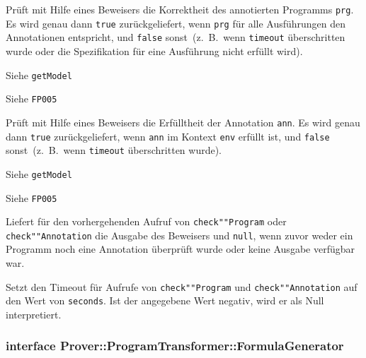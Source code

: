 
\begin{description}%


    Prüft mit Hilfe eines Beweisers die Korrektheit des annotierten
    Programms \texttt{prg}. Es wird genau dann \texttt{true}
    zurückgeliefert, wenn \texttt{prg} für alle Ausführungen den
    Annotationen entspricht, und \texttt{false} sonst~(z.~B.\, wenn
    \texttt{timeout} überschritten wurde oder die Spezifikation für
    eine Ausführung nicht erfüllt wird).%

    Siehe \texttt{getModel}%

    Siehe \texttt{FP005}%


    Prüft mit Hilfe eines Beweisers die Erfülltheit der Annotation
    \texttt{ann}. Es wird genau dann \texttt{true} zurückgeliefert,
    wenn \texttt{ann} im Kontext \texttt{env} erfüllt ist, und
    \texttt{false} sonst~(z.~B.\, wenn \texttt{timeout} überschritten
    wurde).%

    Siehe \texttt{getModel}%

    Siehe \texttt{FP005}%


    Liefert für den vorhergehenden Aufruf von \texttt{check""Program}
    oder \texttt{check""Annotation} die Ausgabe des Beweisers und
    \texttt{null}, wenn zuvor weder ein Programm noch eine Annotation
    überprüft wurde oder keine Ausgabe verfügbar war.%


    Setzt den Timeout für Aufrufe von \texttt{check""Program} und
    \texttt{check""Annotation} auf den Wert von \texttt{seconds}. Ist
    der angegebene Wert negativ, wird er als Null interpretiert.%

\end{description}%

\subsubsection{interface Prover::ProgramTransformer::FormulaGenerator}%

